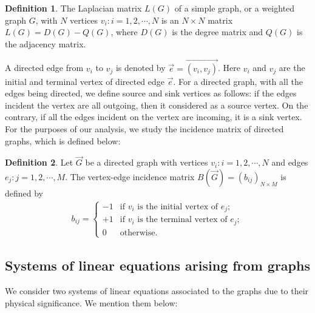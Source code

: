 \documentclass[%
 reprint,
 superscriptaddress,
 amsmath,amssymb,
 aps,
 pra,
floatfix,
nofootinbib,
]{revtex4-2}
\theoremstyle{definition}
\newtheorem{definition}{Definition}[section]
\theoremstyle{remark}
\begin{document}
\begin{definition} \label{def:lapmat}
The Laplacian matrix $L(G)$ of a simple graph, or a weighted graph $G$, with $N$ vertices $v_i: i = 1, 2, \cdots, N$ is an $N \times N$ matrix $L(G) = D(G) - Q(G)$, where $D(G)$ is the degree matrix and $Q(G)$ is the adjacency matrix. 
\end{definition} 

A directed edge from $v_i$ to $v_j$ is denoted by $\vec{e}= \overrightarrow{(v_i, v_j)}$. Here $v_i$ and $v_j$ are the initial and terminal vertex of directed edge $\vec{e}$. For a directed graph, with all the edges being directed, we define source and sink vertices as follows: if the edges incident the vertex are all outgoing, then it considered as a source vertex. On the contrary, if all the edges incident on the vertex are incoming, it is a sink vertex. For the purposes of our analysis, we study the incidence matrix of directed graphs, which is defined below: 

\begin{definition} \label{def:incmat}
Let $\overrightarrow{G}$ be a directed graph with vertices $v_i: i = 1, 2, \cdots, N$ and edges $e_j: j = 1, 2, \cdots, M$. The vertex-edge incidence matrix $B(\overrightarrow{G}) = (b_{ij})_{N \times M}$ is defined by
\begin{eqnarray}
b_{ij} = 
\begin{cases}
-1 & \text{if $v_i$ is the initial vertex of $e_j$};\\ 
+1 & \text{if $v_i$ is the terminal vertex of $e_j$}; \\ 
0 & \text{otherwise}.
\end{cases}
\end{eqnarray}
\end{definition}

\subsection{Systems of linear equations arising from graphs}

We consider two systems of linear equations associated to the graphs due to their physical significance. We mention them below: 
\end{document}
